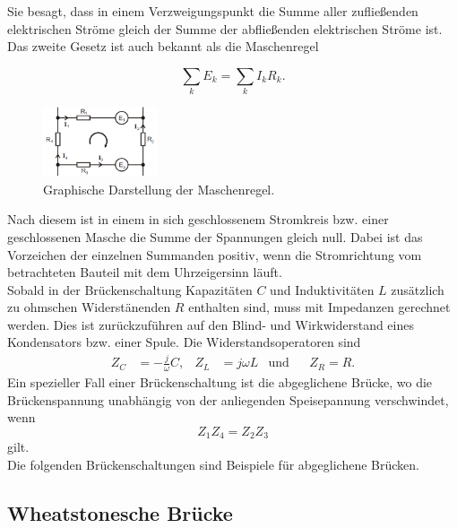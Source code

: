 \noindent Sie besagt, dass in einem Verzweigungspunkt die Summe aller zufließenden elektrischen Ströme gleich der Summe der abfließenden elektrischen Ströme ist. 
Das zweite Gesetz ist auch bekannt als die Maschenregel

\begin{equation}
    \sum_k E_k = \sum_k I_k R_k.
    \label{eqn:masche}
\end{equation}

\begin{figure}[H]
    \centering
    \includegraphics[width=0.3\textwidth]{build/maschen.PNG}
    \caption{Graphische Darstellung der Maschenregel.\cite[217]{V302}}
    \label{fig:maschen}
\end{figure}

\noindent Nach diesem ist in einem in sich geschlossenem Stromkreis bzw. einer geschlossenen Masche die Summe der Spannungen gleich null. 
Dabei ist das Vorzeichen der einzelnen Summanden positiv, wenn die Stromrichtung vom betrachteten Bauteil mit dem Uhrzeigersinn läuft.\\
Sobald in der Brückenschaltung Kapazitäten $C$ und Induktivitäten $L$ zusätzlich zu ohmschen Widerstänenden $R$ enthalten sind, muss mit Impedanzen gerechnet werden.
Dies ist zurückzuführen auf den Blind- und Wirkwiderstand eines Kondensators bzw. einer Spule.
Die Widerstandsoperatoren sind 
\begin{align}
    Z_C &= -\frac{j}{\omega} C , & Z_L &= j\omega L  &\text{und}& &Z_R = R .
    \label{eqn:operatoren}
\end{align}
Ein spezieller Fall einer Brückenschaltung ist die abgeglichene Brücke, wo die Brückenspannung unabhängig von der anliegenden Speisepannung verschwindet, wenn 
\begin{equation}
    Z_1 Z_4 = Z_2 Z_3
    \label{eqn:abgleichbed}
\end{equation}
gilt.\\
Die folgenden Brückenschaltungen sind Beispiele für abgeglichene Brücken.

\subsection{Wheatstonesche Brücke}
\label{subsec:wheatstone}

